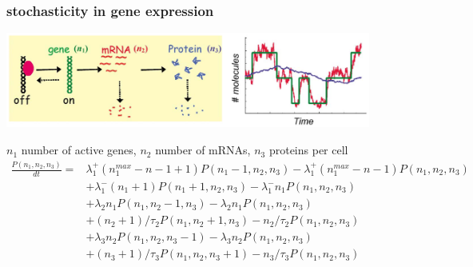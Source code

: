 \begin{frame}
\frametitle{stochasticity in gene expression}
\begin{center}
\includegraphics[width=0.9\textwidth]{fig/stochgeneexpdyn.png}\\
\end{center}
{\scriptsize
$n_1$ number of active genes, $n_2$ number of mRNAs, $n_3$ proteins per cell
\begin{align*}
\frac{P(n_1,n_2,n_3)}{dt} = &\lambda_1^+ (n_1^{max}-n-1 + 1)P(n_1 - 1,n_2,n_3) -\lambda_1^+ (n_1^{max}-n-1)P(n_1,n_2,n_3)\\
&+\lambda_1^- (n_1 + 1)P(n_1 + 1,n_2,n_3) -\lambda_1^- n_1 P(n_1,n_2,n_3)\\
&+\lambda_2 n_1P(n_1,n_2-1,n_3) - \lambda_2 n_1 P(n_1,n_2,n_3)\\
&+(n_2+1)/\tau_2 P(n_1,n_2+1,n_3) - n_2/\tau_2P(n_1,n_2,n_3)\\
&+\lambda_3 n_2 P(n_1,n_2,n_3 - 1) - \lambda_3 n_2 P(n_1,n_2,n_3)\\
&+(n_3 + 1)/\tau_3 P(n_1,n_2,n_3+1) - n_3/\tau_3 P(n_1,n_2,n_3)
\end{align*}}
\end{frame}
